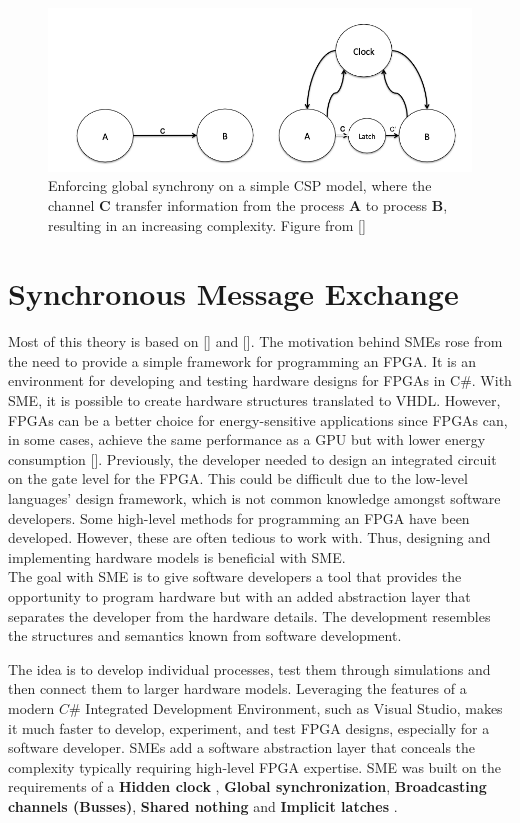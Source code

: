 \begin{figure}
  \centering
  \includegraphics[width=0.7\linewidth]{Pictures/CSP.png}
  \caption{Enforcing global synchrony on a simple CSP model, where the channel \textbf{C} transfer information from the process \textbf{A} to process \textbf{B}, resulting in an increasing complexity. Figure from [\cite{vinter2014synchronous}]}
  \label{fig:csp}
\end{figure}

\section{Synchronous Message Exchange}
\label{sec:SME}

Most of this theory is based on [\cite{vinter2014synchronous}] and [\cite{SME2020}].
The motivation behind SMEs rose from the need to provide a simple framework for programming an FPGA.
It is an environment for developing and testing hardware designs for FPGAs in C\#. With SME, it is possible to create hardware structures translated to VHDL. 
However, FPGAs can be a better choice for energy-sensitive applications since FPGAs can, in some cases, achieve the same performance as a GPU but with lower energy consumption [\cite{SME2020}].
Previously, the developer needed to design an integrated circuit on the gate level for the FPGA. This could be difficult due to the low-level languages' design framework, which is not common knowledge amongst software developers. Some high-level methods for programming an FPGA have been developed. However, these are often tedious to work with. Thus, designing and implementing hardware models is beneficial with SME.\\

The goal with SME is to give software developers a tool that provides the opportunity to program hardware but with an added abstraction layer that separates the developer from the hardware details. The development resembles the structures and semantics known from software development.


The idea is to develop individual processes, test them through simulations and then connect them to larger hardware models. Leveraging the features of a modern $C\#$ Integrated Development Environment, such as Visual Studio, makes it much faster to develop, experiment, and test FPGA designs, especially for a software developer. SMEs add a software abstraction layer that conceals the complexity typically requiring high-level FPGA expertise.
SME was built on the requirements of a
\textbf{Hidden clock }, 
\textbf{Global synchronization}, 
\textbf{Broadcasting channels (Busses)}, 
\textbf{Shared nothing } and 
\textbf{Implicit latches }.\\


